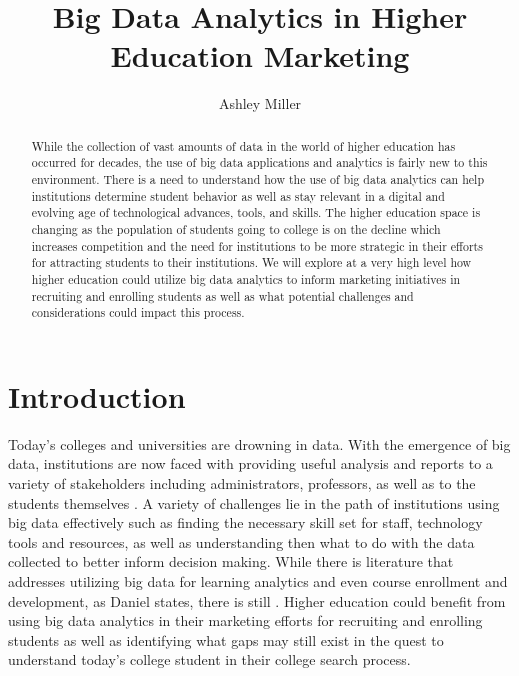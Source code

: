 \documentclass[sigconf]{acmart}
\begin{document}
\title{Big Data Analytics in Higher Education Marketing}


\author{Ashley Miller}



\renewcommand{\shortauthors}{B. Trovato et al.}


\begin{abstract}
While the collection of vast amounts of data in the world of higher education has occurred for decades, the use of big data applications and analytics is fairly new to this environment. There is a need to understand how the use of big data analytics can help institutions determine student behavior as well as stay relevant in a digital and evolving age of technological advances, tools, and skills. The higher education space is changing as the population of students going to college is on the decline which increases competition and the need for institutions to be more strategic in their efforts for attracting students to their institutions. We will explore at a very high level how higher education could utilize big data analytics to inform marketing initiatives in recruiting and enrolling students as well as what potential challenges and considerations could impact this process. 
\end{abstract}



\maketitle

\section{Introduction}

Today's colleges and universities are drowning in data. With the emergence of big data, institutions are now faced with providing useful analysis and reports to a variety of stakeholders including administrators, professors, as well as to the students themselves \cite{Daniel2015}. A variety of challenges lie in the path of institutions using big data effectively such as finding the necessary skill set for staff, technology tools and resources, as well as understanding then what to do with the data collected to better inform decision making. 
While there is literature that addresses utilizing big data for learning analytics and even course enrollment and development, as Daniel states, there is still  \cite{Daniel2015}. Higher education could benefit from using big data analytics in their marketing efforts for recruiting and enrolling students as well as identifying what gaps may still exist in the quest to understand today's college student in their college search process. 
\end{document}

